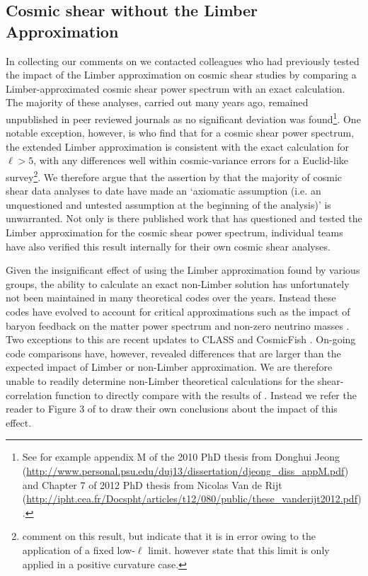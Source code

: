  \subsection{Cosmic shear without the Limber Approximation}
In collecting our comments on \citet{kitching/etal:2016} we contacted colleagues who had previously tested the impact of the Limber approximation on cosmic shear studies by comparing a Limber-approximated cosmic shear power spectrum with an exact calculation.  The majority of these analyses, carried out many years ago, remained unpublished in peer reviewed journals as no significant deviation was found\footnote{See for example appendix M of the 2010 PhD thesis from Donghui Jeong (\url{http://www.personal.psu.edu/duj13/dissertation/djeong_diss_appM.pdf}) and Chapter 7 of 2012 PhD thesis from Nicolas Van de Rijt (\url{http://ipht.cea.fr/Docspht/articles/t12/080/public/these_vanderijt2012.pdf}).}.  One notable exception, however, is \citet{giannantonio/etal:2012} who find that for a cosmic shear power spectrum, the extended Limber approximation is consistent with the exact calculation for $\ell>5$, with any differences well within cosmic-variance errors for a Euclid-like survey\footnote{\citet{kitching/etal:2016} comment on this result, but indicate that it is in error owing to the application of a fixed low-$\ell$ limit.  \citet{giannantonio/etal:2012} however state that this limit is only applied in a positive curvature case.}.  We therefore argue that the assertion by \citet{kitching/etal:2016} that the majority of cosmic shear data analyses to date have made an `axiomatic assumption (i.e. an unquestioned and untested assumption at the beginning of the analysis)'  is unwarranted.  Not only is there published work that has questioned and tested the Limber approximation for the cosmic shear power spectrum, individual teams have also verified this result internally for their own cosmic shear analyses.    

Given the insignificant effect of using the Limber approximation found by various groups, the ability to calculate an exact non-Limber solution has unfortunately not been maintained in many theoretical codes over the years.  Instead these codes have evolved to account for critical approximations such as the impact of baryon feedback on the matter power spectrum and non-zero neutrino masses \citep[see for example][]{joudaki/etal:2016, mead/etal:2016}.    Two exceptions to this are recent updates to CLASS \citep{blas/lesgourgues/tram:2011,audren/etal:2013} and CosmicFish \citep{raveri/etal:2016}.  On-going code comparisons have, however, revealed differences that are larger than the expected impact of Limber or non-Limber approximation.   We are therefore unable to readily determine non-Limber theoretical calculations for the shear-correlation function to directly compare with the results of \citet{kitching/etal:2016}.   Instead we refer the reader to Figure 3 of \citet{giannantonio/etal:2012} to draw their own conclusions about the impact of this effect.



 
 
 
 
 
 
 
